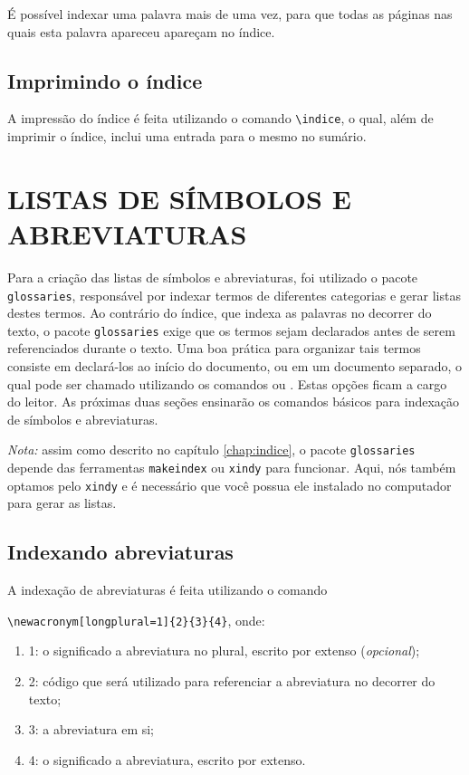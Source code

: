 \documentclass{fei}
\begin{document}
	É possível indexar uma palavra mais de uma vez, para que todas as páginas nas quais esta palavra apareceu apareçam no índice.
	
	\section{Imprimindo o índice}

	A impressão do índice é feita utilizando o comando \verb+\indice+, o qual, além de imprimir o índice, inclui uma entrada para o mesmo no sumário.

	\chapter{LISTAS DE SÍMBOLOS E ABREVIATURAS} \label{chap:listas}
	
	Para a criação das listas de símbolos e abreviaturas, foi utilizado o pacote \verb+glossaries+, responsável por indexar termos de diferentes categorias e gerar listas destes termos. Ao contrário do índice, que indexa as palavras no decorrer do texto, o pacote \verb+glossaries+ exige que os termos sejam declarados antes de serem referenciados durante o texto. Uma boa prática para organizar tais termos consiste em declará-los ao início do documento, ou em um documento separado, o qual pode ser chamado utilizando os comandos \verb++ ou \verb++. Estas opções ficam a cargo do leitor. As próximas duas seções ensinarão os comandos básicos para indexação de símbolos e abreviaturas.
	
	\emph{Nota:} assim como descrito no capítulo \ref{chap:indice}, o pacote \texttt{glossaries} depende das ferramentas \texttt{makeindex} ou \texttt{xindy} para funcionar. Aqui, nós também optamos pelo \texttt{xindy} e é necessário que você possua ele instalado no computador para gerar as listas.
	
	\section{Indexando abreviaturas}
	
	A indexação de abreviaturas é feita utilizando o comando
	
	\verb+\newacronym[longplural=1]{2}{3}{4}+, onde:
	
	\begin{enumerate}
	\item 1: o significado a abreviatura no plural, escrito por extenso (\emph{opcional});
	\item 2: código que será utilizado para referenciar a abreviatura no decorrer do texto;
	\item 3: a abreviatura em si;
	\item 4: o significado a abreviatura, escrito por extenso.
	\end{enumerate}
	
\end{document}
